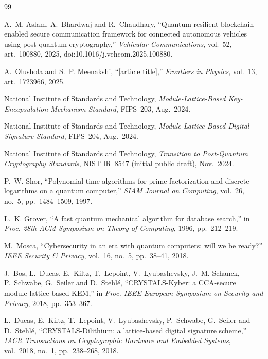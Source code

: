 \begin{thebibliography}{99}

 A.~M. Aslam, A.~Bhardwaj and R.~Chaudhary, ``Quantum-resilient blockchain-enabled secure communication framework for connected autonomous vehicles using post-quantum cryptography,'' \emph{Vehicular Communications}, vol.~52, art.~100880, 2025, doi:10.1016/j.vehcom.2025.100880.

 A.~Olushola and S.~P. Meenakshi, ``[article title],'' \emph{Frontiers in Physics}, vol.~13, art.~1723966, 2025.

 National Institute of Standards and Technology, \emph{Module-Lattice-Based Key-Encapsulation Mechanism Standard}, FIPS~203, Aug.~2024.

 National Institute of Standards and Technology, \emph{Module-Lattice-Based Digital Signature Standard}, FIPS~204, Aug.~2024.

 National Institute of Standards and Technology, \emph{Transition to Post-Quantum Cryptography Standards}, NIST IR~8547 (initial public draft), Nov.~2024.

 P.~W. Shor, ``Polynomial-time algorithms for prime factorization and discrete logarithms on a quantum computer,'' \emph{SIAM Journal on Computing}, vol.~26, no.~5, pp.~1484--1509, 1997.

 L.~K. Grover, ``A fast quantum mechanical algorithm for database search,'' in \emph{Proc. 28th ACM Symposium on Theory of Computing}, 1996, pp.~212--219.

 M.~Mosca, ``Cybersecurity in an era with quantum computers: will we be ready?'' \emph{IEEE Security \& Privacy}, vol.~16, no.~5, pp.~38--41, 2018.

 J.~Bos, L.~Ducas, E.~Kiltz, T.~Lepoint, V.~Lyubashevsky, J.~M. Schanck, P.~Schwabe, G.~Seiler and D.~Stehl\'e, ``CRYSTALS-Kyber: a CCA-secure module-lattice-based KEM,'' in \emph{Proc. IEEE European Symposium on Security and Privacy}, 2018, pp.~353--367.

 L.~Ducas, E.~Kiltz, T.~Lepoint, V.~Lyubashevsky, P.~Schwabe, G.~Seiler and D.~Stehl\'e, ``CRYSTALS-Dilithium: a lattice-based digital signature scheme,'' \emph{IACR Transactions on Cryptographic Hardware and Embedded Systems}, vol.~2018, no.~1, pp.~238--268, 2018.


\end{thebibliography}

